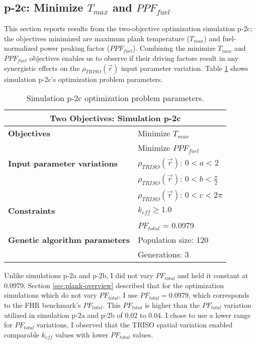 \subsection{p-2c: Minimize $T_{max}$ and $PPF_{fuel}$}
\label{sec:p-2c}
This section reports results from the two-objective optimization simulation p-2c; the 
objectives minimized are maximum plank temperature ($T_{max}$) and fuel-normalized 
power peaking factor ($PPF_{fuel}$).  
Combining the minimize $T_{max}$ and $PPF_{fuel}$ objectives enables us to observe if 
their driving factors result in any synergistic effects on the
$\rho_{TRISO}(\vec{r})$ input parameter variation. 
Table \ref{tab:simulationp2c} shows simulation p-2c's optimization problem parameters. 
\begin{table}[htbp!]
    \centering
    \onehalfspacing
    \caption{Simulation p-2c optimization problem parameters.}
	\label{tab:simulationp2c}
    \footnotesize
    \begin{tabular}{l|p{4cm}}
    \hline 
    \multicolumn{2}{c}{\textbf{Two Objectives: Simulation p-2c}} \\
    \hline 
    \textbf{Objectives} & Minimize $T_{max}$ \\
    & Minimize $PPF_{fuel}$ \\
    \hline 
    \textbf{Input parameter variations} 
    & $\rho_{TRISO}(\vec{r})$: $0<a<2$ \\
    & $\rho_{TRISO}(\vec{r})$: $0<b<\frac{\pi}{2}$ \\
    & $\rho_{TRISO}(\vec{r})$: $0<c<2\pi$ \\
    \hline
    \textbf{Constraints} & $k_{eff} \geq 1.0$\\ 
    & $PF_{total}$ = 0.0979\\
    \hline 
    \textbf{Genetic algorithm parameters} & Population size: 120 \\
    & Generations: 3 \\
    \hline
    \end{tabular}
\end{table}
Unlike simulations p-2a and p-2b, I did not vary $PF_{total}$ and held it constant at 
0.0979. 
Section \ref{sec:plank-overview} described that for the optimization simulations which 
do not vary $PF_{total}$, I use $PF_{total} = 0.0979$, which corresponds to the 
\gls{FHR} benchmark's $PF_{total}$.  
This $PF_{total}$ is higher than the $PF_{total}$ variation utilized in simulation p-2a 
and p-2b of 0.02 to 0.04. 
I chose to use a lower range for $PF_{total}$ variations, I observed that the TRISO 
spatial variation enabled comparable $k_{eff}$ values with lower $PF_{total}$ values. 

